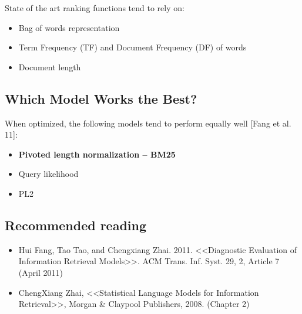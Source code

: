 State of the art ranking functions tend to rely on:
\begin{itemize}
\item Bag of words representation
\item Term Frequency (TF) and Document Frequency (DF) of words 
\item Document length
\end{itemize}

\subsection{Which Model Works the Best?}
When optimized, the following models tend to perform equally well [Fang et al. 11]:
\begin{itemize}
\item \textbf{Pivoted length normalization – BM25}
\item Query likelihood
\item PL2
\end{itemize}


\subsection{Recommended reading}
\begin{itemize}
\item Hui Fang, Tao Tao, and Chengxiang Zhai. 2011. <<Diagnostic Evaluation of Information Retrieval Models>>. ACM Trans. Inf. Syst. 29, 2, Article 7 (April 2011)
\item ChengXiang Zhai, <<Statistical Language Models for Information Retrieval>>, Morgan \& Claypool Publishers, 2008. (Chapter 2)
\end{itemize}
